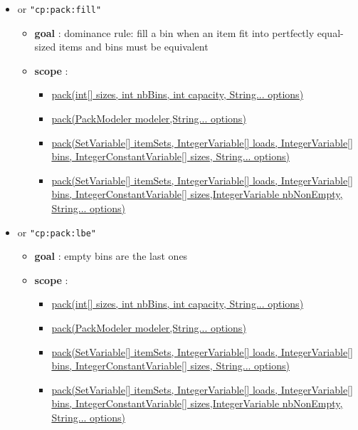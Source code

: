 \begin{itemize}
\begin{itemize}
		\end{itemize}
		\item \label{cpackfill:cpackfilloptions}\hypertarget{cpackfill:cpackfilloptions}{}		
		 or \texttt{"cp:pack:fill"}
		\begin{itemize}
				\item \textbf{goal} : dominance rule: fill a bin when an item fit into pertfectly equal-sized items and bins must be equivalent
				\item \textbf{scope} : 
					\begin{itemize}
						\item \hyperlink{pack:packconstraint}{pack(int[] sizes, int nbBins, int capacity, String... options)}
						\item \hyperlink{pack:packconstraint}{pack(PackModeler modeler,String... options)}
						\item \hyperlink{pack:packconstraint}{pack(SetVariable[] itemSets, IntegerVariable[] loads, IntegerVariable[] bins, IntegerConstantVariable[] sizes, String... options)}
						\item \hyperlink{pack:packconstraint}{pack(SetVariable[] itemSets, IntegerVariable[] loads, IntegerVariable[] bins, IntegerConstantVariable[] sizes,IntegerVariable nbNonEmpty, String... options)}						
					\end{itemize}
		\end{itemize}
		\item \label{cpacklbe:cpacklbeoptions}\hypertarget{cpacklbe:cpacklbeoptions}{}		
		 or \texttt{"cp:pack:lbe"}
		\begin{itemize}
				\item \textbf{goal} : empty bins are the last ones
				\item \textbf{scope} : 
					\begin{itemize}
						\item \hyperlink{pack:packconstraint}{pack(int[] sizes, int nbBins, int capacity, String... options)}
						\item \hyperlink{pack:packconstraint}{pack(PackModeler modeler,String... options)}
						\item \hyperlink{pack:packconstraint}{pack(SetVariable[] itemSets, IntegerVariable[] loads, IntegerVariable[] bins, IntegerConstantVariable[] sizes, String... options)}
						\item \hyperlink{pack:packconstraint}{pack(SetVariable[] itemSets, IntegerVariable[] loads, IntegerVariable[] bins, IntegerConstantVariable[] sizes,IntegerVariable nbNonEmpty, String... options)}						

\end{itemize}
\end{itemize}
\end{itemize}
